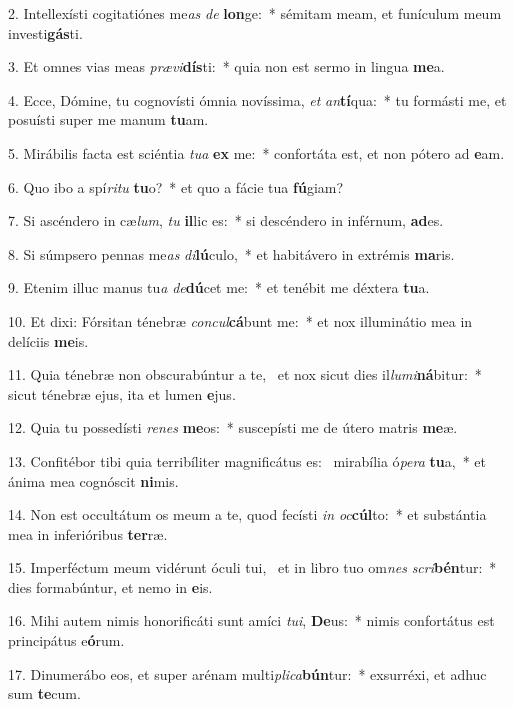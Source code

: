 2. Intellexísti cogitatiónes me\textit{as} \textit{de} \textbf{lon}ge:~*  sémitam meam, et funículum meum investi\textbf{gás}ti.\

3. Et omnes vias meas \textit{præ}\textit{vi}\textbf{dís}ti:~*  quia non est sermo in lingua \textbf{me}a.\

4. Ecce, Dómine, tu cognovísti ómnia novíssima, \textit{et} \textit{an}\textbf{tí}qua:~*  tu formásti me, et posuísti super me manum \textbf{tu}am.\

5. Mirábilis facta est sciéntia \textit{tu}\textit{a} \textbf{ex} me:~*  confortáta est, et non pótero ad \textbf{e}am.\

6. Quo ibo a spí\textit{ri}\textit{tu} \textbf{tu}o?~*  et quo a fácie tua \textbf{fú}giam?\

7. Si ascéndero in cæ\textit{lum}, \textit{tu} \textbf{il}lic es:~*  si descéndero in inférnum, \textbf{ad}es.\

8. Si súmpsero pennas me\textit{as} \textit{di}\textbf{lú}culo,~*  et habitávero in extrémis \textbf{ma}ris.\

9. Etenim illuc manus tu\textit{a} \textit{de}\textbf{dú}cet me:~*  et tenébit me déxtera \textbf{tu}a.\

10. Et dixi: Fórsitan ténebræ \textit{con}\textit{cul}\textbf{cá}bunt me:~*  et nox illuminátio mea in delíciis \textbf{me}is.\

11. Quia ténebræ non obscurabúntur a te, \dag\  et nox sicut dies il\textit{lu}\textit{mi}\textbf{ná}bitur:~*  sicut ténebræ ejus, ita et lumen \textbf{e}jus.\

12. Quia tu possedísti \textit{re}\textit{nes} \textbf{me}os:~*  suscepísti me de útero matris \textbf{me}æ.\

13. Confitébor tibi quia terribíliter magnificátus es: \dag\  mirabília ó\textit{pe}\textit{ra} \textbf{tu}a,~*  et ánima mea cognóscit \textbf{ni}mis.\

14. Non est occultátum os meum a te, quod fecísti \textit{in} \textit{oc}\textbf{cúl}to:~*  et substántia mea in inferióribus \textbf{ter}ræ.\

15. Imperféctum meum vidérunt óculi tui, \dag\  et in libro tuo om\textit{nes} \textit{scri}\textbf{bén}tur:~*  dies formabúntur, et nemo in \textbf{e}is.\

16. Mihi autem nimis honorificáti sunt amíci \textit{tu}\textit{i}, \textbf{De}us:~*  nimis confortátus est principátus e\textbf{ó}rum.\

17. Dinumerábo eos, et super arénam multi\textit{pli}\textit{ca}\textbf{bún}tur:~*  exsurréxi, et adhuc sum \textbf{te}cum.\

